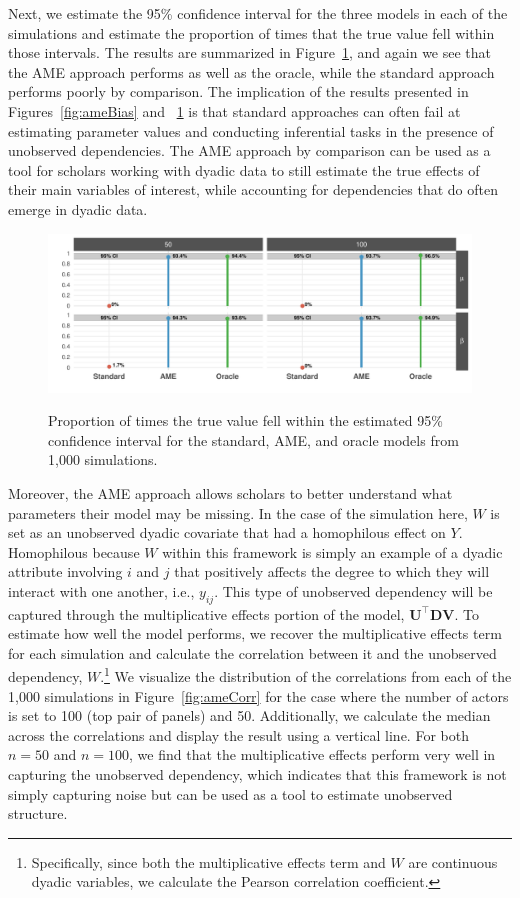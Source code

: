 Next, we estimate the 95\% confidence interval for the three models in each of the simulations and estimate the proportion of times that the true value fell within those intervals. The results are summarized in Figure~\ref{fig:ameCalib}, and again we see that the AME approach performs as well as the oracle, while the standard approach performs poorly by comparison. The implication of the results presented in Figures~\ref{fig:ameBias} and ~\ref{fig:ameCalib} is that standard approaches can often fail at estimating parameter values and conducting inferential tasks in the presence of unobserved dependencies. The AME approach by comparison can be used as a tool for scholars working with dyadic data to still estimate the true effects of their main variables of interest, while accounting for dependencies that do often emerge in dyadic data. 

\begin{figure}
	\centering
	\caption{Proportion of times the true value fell within the estimated 95\% confidence interval for the standard, AME, and oracle models from 1,000 simulations.}
	\label{fig:ameCalib}
	\includegraphics[width=1\textwidth]{ameSimCover_all.pdf} \\
\end{figure}

Moreover, the AME approach allows scholars to better understand what parameters their model may be missing. In the case of the simulation here, $W$ is set as an unobserved dyadic covariate that had a homophilous effect on $Y$. Homophilous because $W$ within this framework is simply an example of a dyadic attribute involving $i$ and $j$ that positively affects the degree to which they will interact with one another, i.e., $y_{ij}$. This type of unobserved dependency will be captured through the multiplicative effects portion of the model, $\mathbf{U}^{\top} \mathbf{D} \mathbf{V}$. To estimate how well the model performs, we recover the multiplicative effects term for each simulation and calculate the correlation between it and the unobserved dependency, $W$.\footnote{Specifically, since both the multiplicative effects term and $W$ are continuous dyadic variables, we calculate the Pearson correlation coefficient.} We visualize the distribution of the correlations from each of the 1,000 simulations in Figure~\ref{fig:ameCorr} for the case where the number of actors is set to 100 (top pair of panels) and 50. Additionally, we calculate the median across the correlations and display the result using a vertical line. For both $n=50$ and $n=100$, we find that the multiplicative effects perform very well in capturing the unobserved dependency, which indicates that this framework is not simply capturing noise but can be used as a tool to estimate unobserved structure. 

